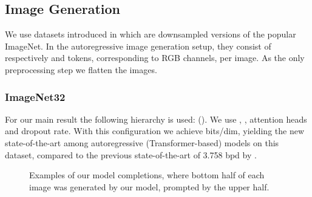 \documentclass[11pt]{article}
\begin{document}
\subsection{Image Generation}\label{sec:im} We use datasets introduced in \cite{DBLP:journals/corr/OordKK16} which are downsampled versions of the popular ImageNet. In the autoregressive image generation setup, they consist of respectively  and  tokens, corresponding to RGB channels, per image. As the only preprocessing step we flatten the images.

\subsubsection{ImageNet32}
For our main result the following hierarchy is used: (). We use , ,  attention heads and  dropout rate. With this configuration we achieve  bits/dim, yielding the new state-of-the-art among autoregressive (Transformer-based) models on this dataset, compared to the previous state-of-the-art of 3.758 bpd by \cite{ho2019axial}. 

\begin{figure}
\centering
\centering
\caption{Examples of our model completions, where bottom half of each image was generated by our model, prompted by the upper half.}
\label{fig:im32}
\end{figure}
\end{document}
